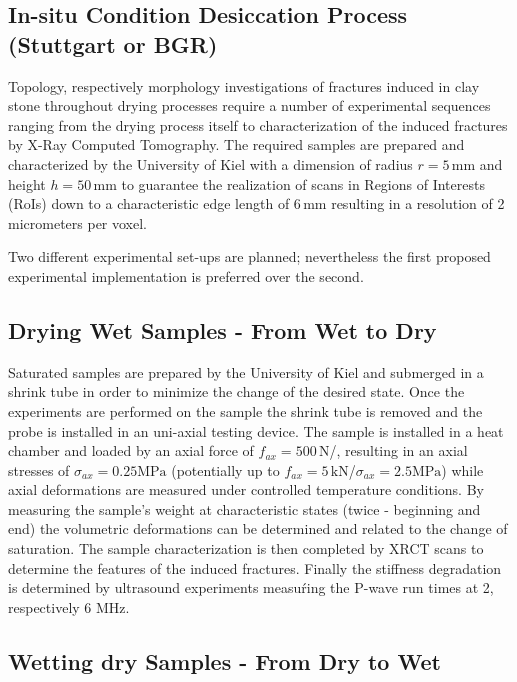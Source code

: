 \subsection{In-situ Condition Desiccation Process (Stuttgart or BGR)}
Topology, respectively morphology investigations of fractures induced in clay stone throughout drying processes require a number of experimental sequences ranging from the drying process itself to characterization of the induced fractures by X-Ray Computed Tomography. The required samples are prepared and characterized by the University of Kiel with a dimension of radius $r = 5 \, \text{mm}$ and height $h = 50 \, \text{mm}$ to guarantee the realization of scans in Regions of Interests (RoIs) down to a characteristic edge length of $6 \, \text{mm}$ resulting in a resolution of 2 micrometers per voxel.

Two different experimental set-ups are planned; nevertheless the first proposed experimental implementation is preferred over the second.

\subsection{Drying Wet Samples - From Wet to Dry}
Saturated samples are prepared by the University of Kiel and submerged in a shrink tube in order to minimize the change of the desired state. Once the experiments are performed on the sample the shrink tube is removed and the probe is installed in an uni-axial testing device. The sample is installed in a heat chamber and loaded by an axial force of $f_{ax} = 500 \, \text{N}$/, resulting in an axial stresses of $ \sigma_{ax} = 0.25 \text{MPa}$ (potentially up to $f_{ax} = 5 \, \text{kN}$/$ \sigma_{ax} = 2.5 \text{MPa}$) while axial deformations are measured under controlled temperature conditions. By measuring the sample's weight at characteristic states (twice - beginning and end) the volumetric deformations can be determined and related to the change of saturation. The sample characterization is then completed by XRCT scans to determine the features of the induced fractures. Finally the stiffness degradation is determined by ultrasound experiments measuŕing the P-wave run times at 2, respectively 6 MHz.

\subsection{Wetting dry Samples - From Dry to Wet}

